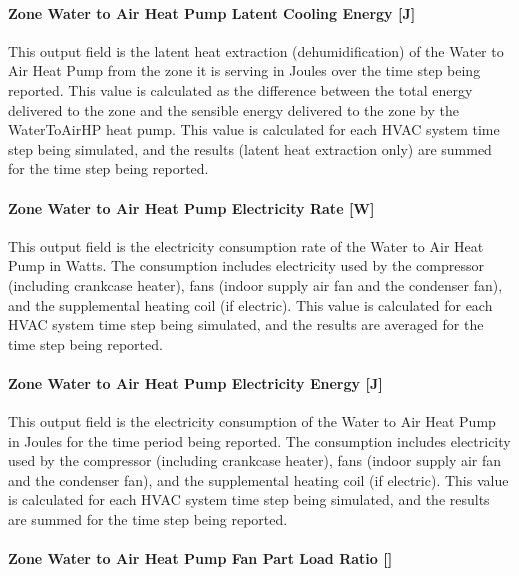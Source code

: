 \paragraph{Zone Water to Air Heat Pump Latent Cooling Energy {[}J{]}}\label{zone-water-to-air-heat-pump-latent-cooling-energy-j}

This output field is the latent heat extraction (dehumidification) of the Water to Air Heat Pump from the zone it is serving in Joules over the time step being reported. This value is calculated as the difference between the total energy delivered to the zone and the sensible energy delivered to the zone by the WaterToAirHP heat pump. This value is calculated for each HVAC system time step being simulated, and the results (latent heat extraction only) are summed for the time step being reported.

\paragraph{Zone Water to Air Heat Pump Electricity Rate {[}W{]}}\label{zone-water-to-air-heat-pump-electric-power-w}

This output field is the electricity consumption rate of the Water to Air Heat Pump in Watts. The consumption includes electricity used by the compressor (including crankcase heater), fans (indoor supply air fan and the condenser fan), and the supplemental heating coil (if electric). This value is calculated for each HVAC system time step being simulated, and the results are averaged for the time step being reported.

\paragraph{Zone Water to Air Heat Pump Electricity Energy {[}J{]}}\label{zone-water-to-air-heat-pump-electric-energy-j}

This output field is the electricity consumption of the Water to Air Heat Pump in Joules for the time period being reported. The consumption includes electricity used by the compressor (including crankcase heater), fans (indoor supply air fan and the condenser fan), and the supplemental heating coil (if electric). This value is calculated for each HVAC system time step being simulated, and the results are summed for the time step being reported.

\paragraph{Zone Water to Air Heat Pump Fan Part Load Ratio {[]}}\label{zone-water-to-air-heat-pump-fan-part-load-ratio}

